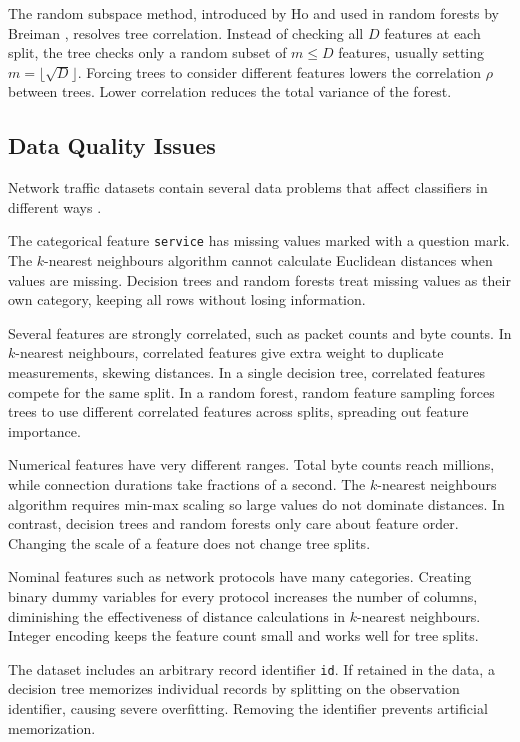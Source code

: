 \documentclass[conference,10pt]{IEEEtran}
\begin{document}
The random subspace method, introduced by Ho \cite{ho1998} and used in random forests by Breiman \cite{breiman2001}, resolves tree correlation. Instead of checking all $D$ features at each split, the tree checks only a random subset of $m \le D$ features, usually setting $m = \lfloor \sqrt{D} \rfloor$. Forcing trees to consider different features lowers the correlation $\rho$ between trees. Lower correlation reduces the total variance of the forest.

\subsection{Data Quality Issues}

Network traffic datasets contain several data problems that affect classifiers in different ways \cite{moustafa2015}.

The categorical feature \texttt{service} has missing values marked with a question mark. The $k$-nearest neighbours algorithm cannot calculate Euclidean distances when values are missing. Decision trees and random forests treat missing values as their own category, keeping all rows without losing information.

Several features are strongly correlated, such as packet counts and byte counts. In $k$-nearest neighbours, correlated features give extra weight to duplicate measurements, skewing distances. In a single decision tree, correlated features compete for the same split. In a random forest, random feature sampling forces trees to use different correlated features across splits, spreading out feature importance.

Numerical features have very different ranges. Total byte counts reach millions, while connection durations take fractions of a second. The $k$-nearest neighbours algorithm requires min-max scaling so large values do not dominate distances. In contrast, decision trees and random forests only care about feature order. Changing the scale of a feature does not change tree splits.

Nominal features such as network protocols have many categories. Creating binary dummy variables for every protocol increases the number of columns, diminishing the effectiveness of distance calculations in $k$-nearest neighbours. Integer encoding keeps the feature count small and works well for tree splits.

The dataset includes an arbitrary record identifier \texttt{id}. If retained in the data, a decision tree memorizes individual records by splitting on the observation identifier, causing severe overfitting. Removing the identifier prevents artificial memorization.
\end{document}
